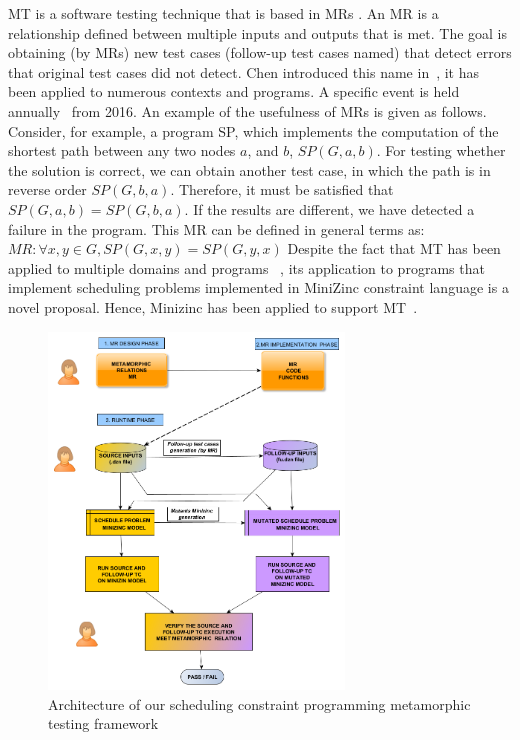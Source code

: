 MT is a software testing technique that is based in MRs \cite{segura2011automated}.
An MR is a relationship defined between multiple inputs and outputs that is met. 
The goal is obtaining (by MRs) new test cases (follow-up test cases named) that detect errors that original test cases did not detect. Chen introduced this name in~\cite{chen1998metamorphic}, it has been applied to numerous contexts and programs. A specific event is held annually~\cite{ 7961643,Xie:2019:3340651} from 2016. 
An example of the usefulness of MRs is given as follows. Consider, for example, a program SP, which implements the computation of the shortest path between any two nodes $a$, and $b$, $SP(G,a,b)$. For testing whether the solution is correct, we can obtain another test case, in which the path is in reverse order $SP(G,b,a)$. Therefore, it must be satisfied that $SP(G,a,b)= SP(G,b,a)$. If the results are different, we have detected a failure in the program. This MR can be defined in general terms as: 
$MR: \forall x, y \in G, SP(G, x,y) = SP(G, y,x) $
Despite the fact that MT has been applied to multiple domains and programs ~\cite{Chen:2018:MTR:3177787.3143561,almendros2021metamorphic}, its application to programs that implement scheduling problems implemented in MiniZinc constraint language is a novel proposal. Hence, Minizinc has been applied to support MT~\cite{de2019using}.\\

\begin{figure}[h!]
    \centering
    \includegraphics[scale=0.85,width=0.7\textwidth]{Figures/SCHEDUL_MR_MZ_ARCH.png}
    \caption{Architecture of our scheduling constraint programming metamorphic testing framework}
    \label{fig:MTSchedArch}
\end{figure}


